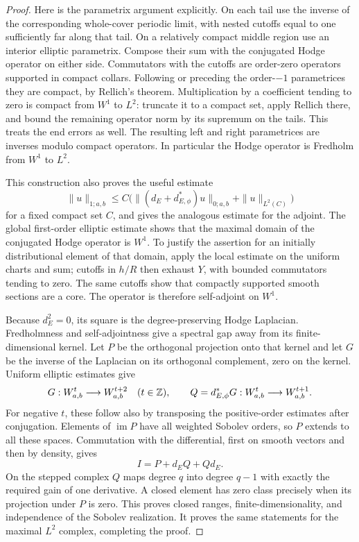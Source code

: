 \begin{proof}
Here is the parametrix argument explicitly. On each tail use the inverse
of the corresponding whole-cover periodic limit, with nested cutoffs
equal to one sufficiently far along that tail. On a relatively compact
middle region use an interior elliptic parametrix. Compose their sum
with the conjugated Hodge operator on either side. Commutators with the
cutoffs are order-zero operators supported in compact collars. Following
or preceding the order-$-1$ parametrices they are compact, by Rellich's
theorem. Multiplication by a coefficient tending to zero is compact
from $W^1$ to $L^2$: truncate it to a compact set, apply Rellich there,
and bound the remaining operator norm by its supremum on the tails.
This treats the end errors as well. The resulting left and right
parametrices are inverses modulo compact operators. In particular the
Hodge operator is Fredholm from $W^1$ to $L^2$.

This construction also proves the useful estimate
\begin{equation}\label{weighted:fredholm-estimate}
 \|u\|_{1;a,b}\le C\bigl(
 \|(d_E+d_{E,\phi}^*)u\|_{0;a,b}
       +\|u\|_{L^2(C)}\bigr)
\end{equation}
for a fixed compact set $C$, and gives the analogous estimate for the
adjoint. The global first-order elliptic estimate shows that the
maximal domain of the conjugated Hodge operator is $W^1$. To justify
the assertion for an initially distributional element of that domain,
apply the local estimate on the uniform charts and sum; cutoffs in
$h/R$ then exhaust $Y$, with bounded commutators tending to zero.
The same cutoffs show that compactly supported smooth sections are a
core. The operator is therefore self-adjoint on $W^1$.

Because $d_E^2=0$, its square is the degree-preserving Hodge Laplacian.
Fredholmness and self-adjointness give a spectral gap away from its
finite-dimensional kernel. Let $P$ be the orthogonal projection onto
that kernel and let $G$ be the inverse of the Laplacian on its
orthogonal complement, zero on the kernel. Uniform elliptic estimates
give
\[
 G:W^t_{a,b}\longrightarrow W^{t+2}_{a,b}
 \quad(t\in\mathbb Z),\qquad
 Q=d_{E,\phi}^*G:W^t_{a,b}\longrightarrow W^{t+1}_{a,b}.
\]
For negative $t$, these follow also by transposing the positive-order
estimates after conjugation. Elements of $\operatorname{im}P$ have all
weighted Sobolev orders, so $P$ extends to all these spaces. Commutation
with the differential, first on smooth vectors and then by density,
gives
\begin{equation}\label{weighted:homotopy}
 I=P+d_EQ+Qd_E.
\end{equation}
On the stepped complex $Q$ maps degree $q$ into degree $q-1$ with
exactly the required gain of one derivative. A closed element has zero
class precisely when its projection under $P$ is zero. This proves
closed ranges, finite-dimensionality, and independence of the Sobolev
realization. It proves the same statements for the maximal $L^2$
complex, completing the proof.
\end{proof}

